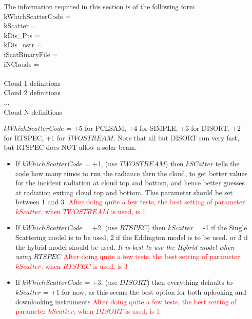 \documentclass[12pt]{article}
\newcommand{\ttab}{\indent\indent}
\begin{document}
{{The information required in this section is of the following form\\
\medskip
\ttab kWhichScatterCode    = \\
\ttab kScatter             = \\
\ttab kDis\_Pts            = \\
\ttab kDis\_nstr           = \\
\ttab iScatBinaryFile      = \\
\ttab iNClouds           = \\
\ttab \\
\ttab Cloud 1 definitions \\
\ttab Cloud 2 definitions \\
\ttab ...\\
\ttab Cloud N definitions \\
\ttab

\noindent $kWhichScatterCode$ = +5 for PCLSAM, +4 for SIMPLE, +3 for DISORT, 
+2 for RTSPEC,  +1 for $TWOSTREAM$. Note that all but DISORT run very fast, 
but RTSPEC does NOT allow a solar beam.
\vspace{0.25in} 

\begin{itemize}
\item If $kWhichScatterCode$ = +1, (use $TWOSTREAM$) then $kSCatter$ tells 
the code how many times to run the radiance thru the cloud, to get better 
values for the incident radiation at cloud top and bottom, and hence better 
guesses at radiation exiting cloud top and bottom. This parameter should be 
set between 1 and 3.
\textcolor{red}
{After doing quite a few tests, the best setting of parameter $kScatter$, when 
$TWOSTREAM$ is used, is 1}

\item If $kWhichScatterCode$ = +2, (use $RTSPEC$) then  $kScatter$ = -1 
if the Single Scattering model is to be used, 2 if the Eddington model is to 
be used, or 3 if the hybrid model should be used. {\em It is best to use the 
Hybrid model when using $RTSPEC$}
\textcolor{red}
{After doing quite a few tests, the best setting of parameter $kScatter$, when 
$RTSPEC$ is used, is 3}

\item If $kWhichScatterCode$ = +3, (use $DISORT$) then everything defaults to 
$kScatter$ = +1 for now, as this seems the best option for both uplooking and 
downlooking instruments
\textcolor{red}
{After doing quite a few tests, the best setting of parameter $kScatter$, when 
$DISORT$ is used, is 1}
\end{itemize}

}}
\end{document}
